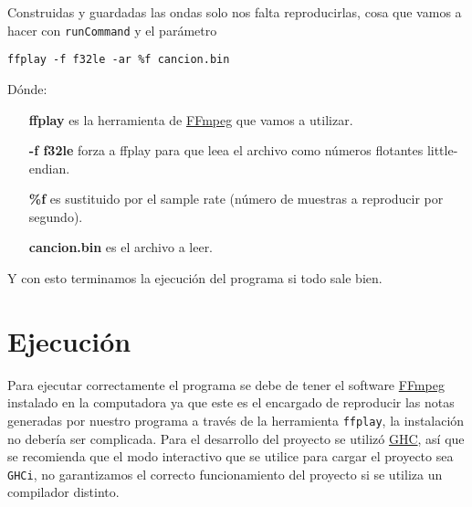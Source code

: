 \documentclass[10pt,a4paper]{article}
\begin{document}
Construidas y guardadas las ondas solo nos falta reproducirlas, cosa que vamos a hacer con \textcolor{gunaBlueLite}{\texttt{runCommand}} y el parámetro\\


\begin{center}
\texttt{ffplay -f f32le -ar \%f cancion.bin}
\end{center}
Dónde:
\begin{itemize}
\item [\textbf{ffplay}] es la herramienta de \href{https://ffmpeg.org/}{FFmpeg} que vamos a utilizar.
\item [\textbf{-f f32le}] forza a ffplay para que leea el archivo como números flotantes little-endian.
\item [\textbf{ \%f }] es sustituido por el sample rate (número de muestras a reproducir por segundo).
\item [\textbf{cancion.bin}] es el archivo a leer.
\end{itemize}

Y con esto terminamos la ejecución del programa si todo sale bien.

\section{Ejecución}
\noindent Para ejecutar correctamente el programa se debe de tener el software
\href{https://ffmpeg.org/}{FFmpeg} instalado en la computadora ya que este es el
encargado de reproducir las notas generadas por nuestro programa a través de la
herramienta \texttt{ffplay}, la instalación no debería ser complicada. Para el
desarrollo del proyecto se utilizó \href{https://www.haskell.org/ghc/}{GHC}, así
que se recomienda que el modo interactivo que se utilice para cargar el proyecto
sea \texttt{GHCi}, no garantizamos el correcto funcionamiento del proyecto si se
utiliza un compilador distinto.
\end{document}
